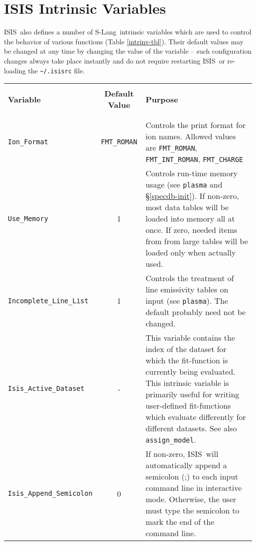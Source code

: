 \documentclass{book}
\newcommand{\isisx}{{\sc ISIS~}}
\newcommand{\isis}{{\sc ISIS}}
\newcommand{\slang}{{\sc S-Lang}}
\begin{document}
\newpage
\section{ISIS Intrinsic Variables}
\label{sec:intrin-var}

\isisx also defines a number of \slang\ intrinsic variables which
are used to control the behavior of various functions (Table
\ref{intrinv-tbl}).  Their default values may be changed at any time by
changing the value of the variable -- such configuration changes always take
place instantly and do not require restarting \isisx or re-loading the
\verb|~/.isisrc| file.

\vspace*{-2cm}
\begin{center}
\label{intrinv-tbl} %
\begin{tabular}{|l|c|p{3.2in}|}
\hline
\rule[-1mm]{0mm}{1mm} & & \hfill \\
{\bf Variable} & {\bf Default Value} &  {\bf Purpose} \\
\rule[-1mm]{0mm}{1mm} & & \hfill \\
\hline
\rule[-1mm]{0mm}{1mm} & & \hfill \\
{\tt Ion\_Format}  & {\tt FMT\_ROMAN} & Controls the print format
for ion names. Allowed values are {\tt FMT\_ROMAN}, {\tt FMT\_INT\_ROMAN},
{\tt FMT\_CHARGE} \\
{\tt Use\_Memory} & 1 & Controls run-time memory usage (see {\tt plasma} and
\S\ref{specdb-init}). If non-zero, most data tables will be loaded into memory
all at once.  If zero, needed items from from large tables will be loaded
only when actually used.\\
{\tt Incomplete\_Line\_List} & 1 & Controls the treatment of line emissivity
tables on input (see {\tt plasma}). The default probably need not be changed.\\
{\tt Isis\_Active\_Dataset} & - & This variable contains the index of the
dataset for which the fit-function is currently being evaluated.  This
intrinsic variable is primarily useful for writing user-defined fit-functions
which evaluate differently for different datasets.  See also {\tt
assign\_model}.\\
{\tt Isis\_Append\_Semicolon} & 0 & If non-zero, \isis\ will
automatically append a semicolon (;) to each input command line
in interactive mode.  Otherwise, the user must type the semicolon
to mark the end of the command line.\index{{\tt Isis\_Append\_Semicolon}}\\

\end{tabular}
\end{center}
\end{document}
